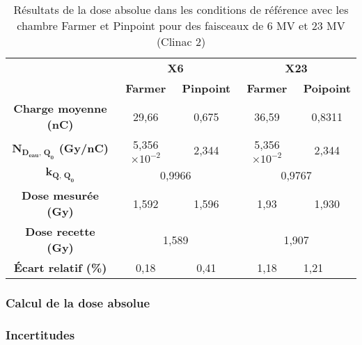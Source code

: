 \documentclass{article}
\begin{document}
\begin{table}[h]
  \centering
  \begin{tabular}{c|cc|cc|}
  \cline{2-5}
                                             & \multicolumn{2}{c|}{\textbf{X6}}    & \multicolumn{2}{c|}{\textbf{X23}}   \\ \cline{2-5} 
                                             & \textbf{Farmer} & \textbf{Pinpoint} & \textbf{Farmer} & \textbf{Poipoint} \\ \hline
  \multicolumn{1}{|c|}{\textbf{Charge moyenne (nC)}} & 29,66           & 0,675             & 36,59           & 0,8311            \\
  \multicolumn{1}{|c|}{\textbf{$\mathbf{N_{D_{eau},\, Q_0}}$ (Gy/nC)}} & 5,356$\times 10^{-2}$ & 2,344 & 5,356$\times 10^{-2}$ & 2,344                     \\
  \multicolumn{1}{|c|}{\textbf{$\mathbf{k_{Q,\, Q_0}}$}}       & \multicolumn{2}{c|}{0,9966}   & \multicolumn{2}{c|}{0,9767}                       \\
  \multicolumn{1}{|c|}{\textbf{Dose mesurée (Gy)}}   & 1,592           & 1,596             & 1,93            & 1,930             \\
  \multicolumn{1}{|c|}{\textbf{Dose recette (Gy)}}             & \multicolumn{2}{c|}{1,589}    & \multicolumn{2}{c|}{1,907}                        \\
  \multicolumn{1}{|c|}{\textbf{Écart relatif (\%)}}            & 0,18                  & 0,41  & 1,18                  & \multicolumn{1}{l|}{1,21} \\ \hline
  \end{tabular}
  \caption{Résultats de la dose absolue dans les conditions de référence avec les chambre Farmer et Pinpoint pour des faisceaux de 6 MV et 23 MV (Clinac 2)}
\end{table}

\subsubsection{Calcul de la dose absolue}

\subsubsection{Incertitudes}
\end{document}
